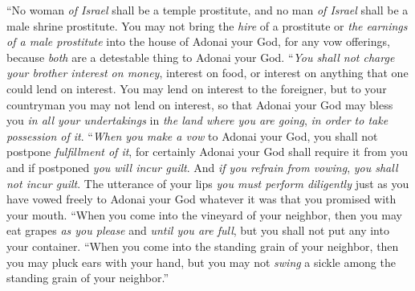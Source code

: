 \begin{biblechapter}
\verse “No woman \textit{of Israel} shall be a temple prostitute, and no man \textit{of Israel} shall be a male shrine prostitute.
\verse You may not bring the \textit{hire} of a prostitute or \textit{the earnings of a male prostitute} into the house of Adonai your God, for any vow offerings, because \textit{both} are a detestable thing to Adonai your God.
\verse “\textit{You shall not charge your brother interest on money}, interest on food, or interest on anything that one could lend on interest.
\verse You may lend on interest to the foreigner, but to your countryman you may not lend on interest, so that Adonai your God may bless you \textit{in all your undertakings} in \textit{the land where you are going}, \textit{in order to take possession of it}.
\verse “\textit{When you make a vow} to Adonai your God, you shall not postpone \textit{fulfillment of it}, for certainly Adonai your God shall require it from you and if postponed \textit{you will incur guilt}.
\verse And \textit{if you refrain from vowing}, \textit{you shall not incur guilt}.
\verse The utterance of your lips \textit{you must perform diligently} just as you have vowed freely to Adonai your God whatever it was that you promised with your mouth.
\verse “When you come into the vineyard of your neighbor, then you may eat grapes \textit{as you please} and \textit{until you are full}, but you shall not put any into your container.
\verse “When you come into the standing grain of your neighbor, then you may pluck ears with your hand, but you may not \textit{swing} a sickle among the standing grain of your neighbor.”
\end{biblechapter}

